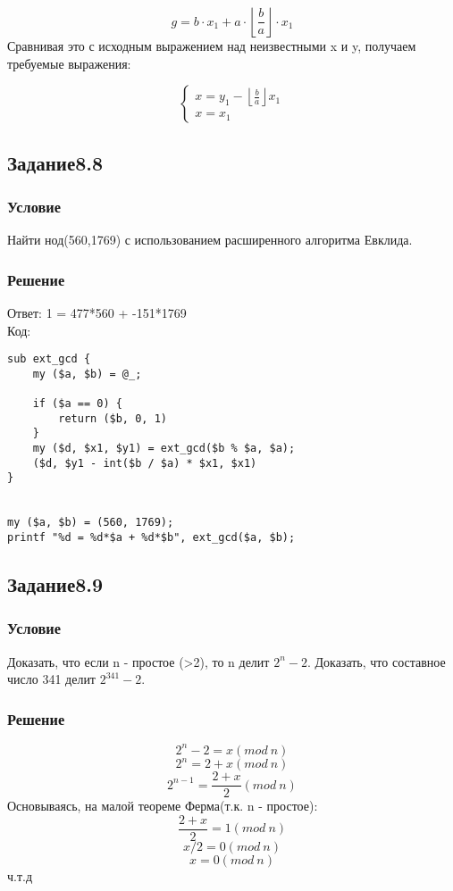 \documentclass[10pt,a4paper]{article}
\begin{document}
$$ g = b \cdot x_1 + a \cdot \left\lfloor \frac{b}{a} \right\rfloor
\cdot x_1   $$
Сравнивая это с исходным выражением над неизвестными x и y, получаем требуемые выражения:

\[
\begin{cases}
x = y_1 - \left\lfloor \frac{b}{a} \right\rfloor x_1 \\
x = x_1
\end{cases}
\]

\subsection*{Задание8.8}
\subsubsection*{Условие}
Найти нод(560,1769) с использованием расширенного алгоритма
Евклида.
\subsubsection*{Решение}
Ответ: 1 = 477*560 + -151*1769 \\
Код:
\begin{lstlisting}
sub ext_gcd {
    my ($a, $b) = @_;

    if ($a == 0) {
        return ($b, 0, 1)
    }
    my ($d, $x1, $y1) = ext_gcd($b % $a, $a);
    ($d, $y1 - int($b / $a) * $x1, $x1)
}


my ($a, $b) = (560, 1769);
printf "%d = %d*$a + %d*$b", ext_gcd($a, $b);
\end{lstlisting}

\subsection*{Задание8.9}
\subsubsection*{Условие}
Доказать, что если n - простое (>2), то n делит $2^n-2$. Доказать, что
составное число 341 делит $2^{341}-2$.
\subsubsection*{Решение}
$$ 2^n - 2 = x (mod\ n) $$
$$ 2^n = 2 + x (mod\ n) $$
$$ 2^{n-1} = \frac{2 + x}{2} (mod\ n) $$
Основываясь, на малой теореме Ферма(т.к. n - простое):
$$ \frac{2 + x}{2} = 1 (mod\ n) $$
$$ x/2 = 0 (mod\ n) $$
$$ x = 0 (mod\ n) $$
ч.т.д
\end{document}
